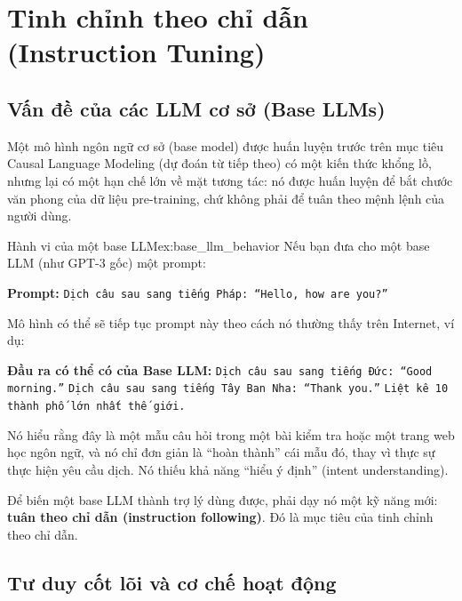 
\section{Tinh chỉnh theo chỉ dẫn (Instruction Tuning)}
\label{sec:instruction_tuning}

\subsection{Vấn đề của các LLM cơ sở (Base LLMs)}
\label{ssec:base_llm_problem}

Một mô hình ngôn ngữ cơ sở (base model) được huấn luyện trước trên mục tiêu Causal Language Modeling (dự đoán từ tiếp theo) có một kiến thức khổng lồ, nhưng lại có một hạn chế lớn về mặt tương tác: nó được huấn luyện để bắt chước văn phong của dữ liệu pre-training, chứ không phải để tuân theo mệnh lệnh của người dùng.

\begin{example}{Hành vi của một base LLM}{ex:base_llm_behavior}
    Nếu bạn đưa cho một base LLM (như GPT-3 gốc) một prompt:

    \textbf{Prompt:} \texttt{Dịch câu sau sang tiếng Pháp: “Hello, how are you?”}

    Mô hình có thể sẽ tiếp tục prompt này theo cách nó thường thấy trên Internet, ví dụ:

    \textbf{Đầu ra có thể có của Base LLM:}
    \texttt{Dịch câu sau sang tiếng Đức: “Good morning.”}
    \texttt{Dịch câu sau sang tiếng Tây Ban Nha: “Thank you.”}
    \texttt{Liệt kê 10 thành phố lớn nhất thế giới.}

    Nó hiểu rằng đây là một mẫu câu hỏi trong một bài kiểm tra hoặc một trang web học ngôn ngữ, và nó chỉ đơn giản là “hoàn thành” cái mẫu đó, thay vì thực sự thực hiện yêu cầu dịch. Nó thiếu khả năng “hiểu ý định” (intent understanding).
\end{example}

Để biến một base LLM thành trợ lý dùng được, phải dạy nó một kỹ năng mới: \textbf{tuân theo chỉ dẫn (instruction following)}. Đó là mục tiêu của tinh chỉnh theo chỉ dẫn.

\subsection{Tư duy cốt lõi và cơ chế hoạt động}
\label{ssec:instruction_tuning_mechanism}

